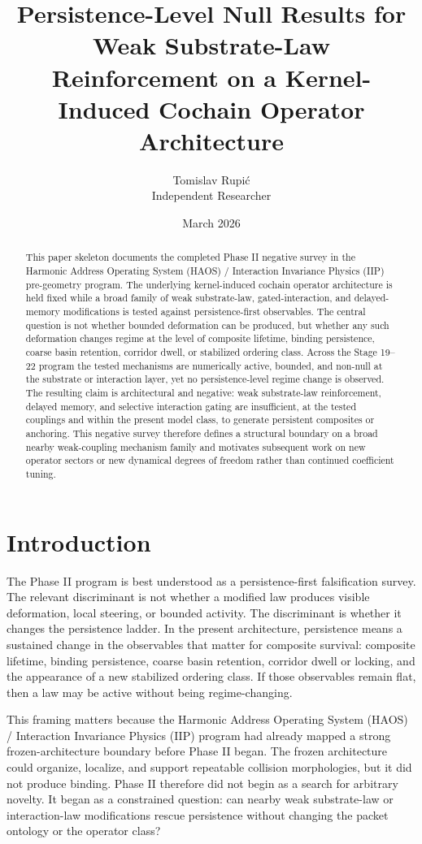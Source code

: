\documentclass[11pt]{article}
\title{Persistence-Level Null Results for Weak Substrate-Law Reinforcement on a Kernel-Induced Cochain Operator Architecture}
\author{Tomislav Rupi\'c \\ Independent Researcher}
\date{March 2026}
\begin{document}
\maketitle

\begin{abstract}
This paper skeleton documents the completed Phase II negative survey in the Harmonic Address Operating System (HAOS) / Interaction Invariance Physics (IIP) pre-geometry program. The underlying kernel-induced cochain operator architecture is held fixed while a broad family of weak substrate-law, gated-interaction, and delayed-memory modifications is tested against persistence-first observables. The central question is not whether bounded deformation can be produced, but whether any such deformation changes regime at the level of composite lifetime, binding persistence, coarse basin retention, corridor dwell, or stabilized ordering class. Across the Stage 19--22 program the tested mechanisms are numerically active, bounded, and non-null at the substrate or interaction layer, yet no persistence-level regime change is observed. The resulting claim is architectural and negative: weak substrate-law reinforcement, delayed memory, and selective interaction gating are insufficient, at the tested couplings and within the present model class, to generate persistent composites or anchoring. This negative survey therefore defines a structural boundary on a broad nearby weak-coupling mechanism family and motivates subsequent work on new operator sectors or new dynamical degrees of freedom rather than continued coefficient tuning.
\end{abstract}

\section{Introduction}

The Phase II program is best understood as a persistence-first falsification survey. The relevant discriminant is not whether a modified law produces visible deformation, local steering, or bounded activity. The discriminant is whether it changes the persistence ladder. In the present architecture, persistence means a sustained change in the observables that matter for composite survival: composite lifetime, binding persistence, coarse basin retention, corridor dwell or locking, and the appearance of a new stabilized ordering class. If those observables remain flat, then a law may be active without being regime-changing.

This framing matters because the Harmonic Address Operating System (HAOS) / Interaction Invariance Physics (IIP) program had already mapped a strong frozen-architecture boundary before Phase II began. The frozen architecture could organize, localize, and support repeatable collision morphologies, but it did not produce binding. Phase II therefore did not begin as a search for arbitrary novelty. It began as a constrained question: can nearby weak substrate-law or interaction-law modifications rescue persistence without changing the packet ontology or the operator class?
\end{document}
